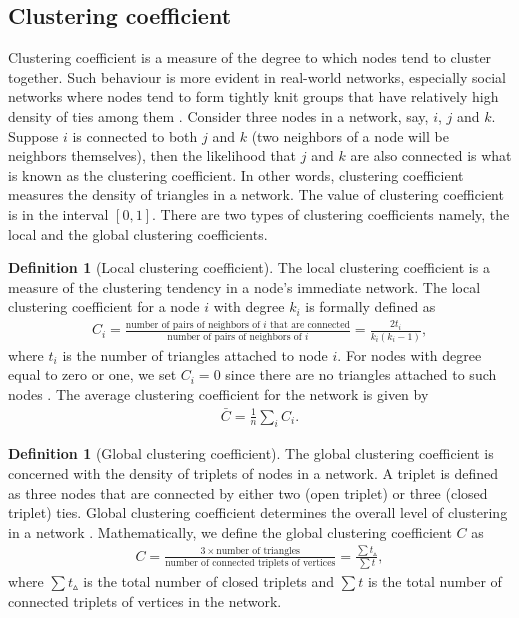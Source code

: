 \documentclass[10pt,a4paper]{article}
\theoremstyle{plain}
\theoremstyle{definition}
\newtheorem{defn}[subsection]{Definition}
\begin{document}
\subsection{Clustering coefficient}
Clustering coefficient is a measure of the degree to which nodes tend to cluster together. Such behaviour is more evident in real-world networks, especially social networks where nodes tend to form tightly knit groups that have relatively high density of ties among them \citep{estrada2015first}.
Consider three nodes in a network, say, $i$, $j$ and $k$. Suppose $i$ is connected to both $j$ and $k$ (two neighbors of a node will be neighbors themselves), then the likelihood that $j$ and $k$ are also connected is what is known as the clustering coefficient. In other words, clustering coefficient measures the density of triangles in a  network. 
The value of clustering coefficient is in the interval $[0,1]$. There are two types of clustering coefficients namely, the local and the global clustering coefficients.

\begin{defn}[Local clustering coefficient]
	The local clustering coefficient is a measure of the clustering tendency in a node's immediate network. The local clustering coefficient for a node $i$ with degree $k_i$ is formally defined as 
	\begin{eqnarray}
	C_i = \frac{\text{number of pairs of neighbors of } i\text{ that are connected}}{\text{number of pairs of neighbors of }i}= \frac{2 t_i}{k_i(k_i-1)},  
	\end{eqnarray}
	where $t_i$ is the number of triangles attached to node $i$. For nodes with degree equal to zero or one, we set $C_i = 0$ since there are no triangles attached to such nodes \citep{newman2010networks}. The average clustering coefficient for the network is given by
	\begin{eqnarray}
	\bar{C} = \frac{1}{n} \sum_i C_i.
	\end{eqnarray} 
\end{defn}

\begin{defn}[Global clustering coefficient]
	The global clustering coefficient is concerned with the density of triplets of nodes in a network. A triplet is defined as three nodes that are connected by either two (open triplet) or three (closed triplet) ties. Global clustering coefficient determines the overall level of clustering in a network \citep{opsahl2009clustering}.
	Mathematically, we define the global clustering coefficient $C$ as
	\begin{eqnarray}
	C = \frac{3 \times \text{number of triangles}}{\text{number of connected triplets of vertices}} = \frac{\sum t_\vartriangle}{\sum t},
	\end{eqnarray}
	where $\sum t_\vartriangle$ is the total number of closed triplets and $\sum t$ is the total number of connected triplets of vertices in the network.
\end{defn}
\end{document}
